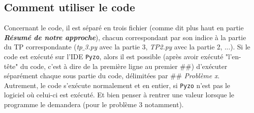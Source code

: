 \documentclass{article}      %
\begin{document}
\subsection{Comment utiliser le code}
Concernant le code, il est séparé en trois fichier (comme dit plus haut en partie \textbf{\textit{Résumé de notre approche}}), chacun correspondant par son indice à la partie du TP correspondante (\textsl{tp$\_$3.py} avec la partie 3, \textsl{TP2.py} avec la partie 2, ...).
Si le code est exécuté sur l'IDE \texttt{Pyzo}, alors il est possible (après avoir exécuté "l'en-tête" du code, c'est à dire de la première ligne  au premier $\#\#$) d'exécuter séparément chaque sous partie du code, délimitées par \textit{$\#\#$ Problème x}.\\
Autrement, le code s'exécute normalement et en entier, si \texttt{Pyzo} n'est pas le logiciel où celui-ci est exécuté. Et bien penser à rentrer une valeur lorsque le programme le demandera (pour le problème 3 notamment).
\end{document}
